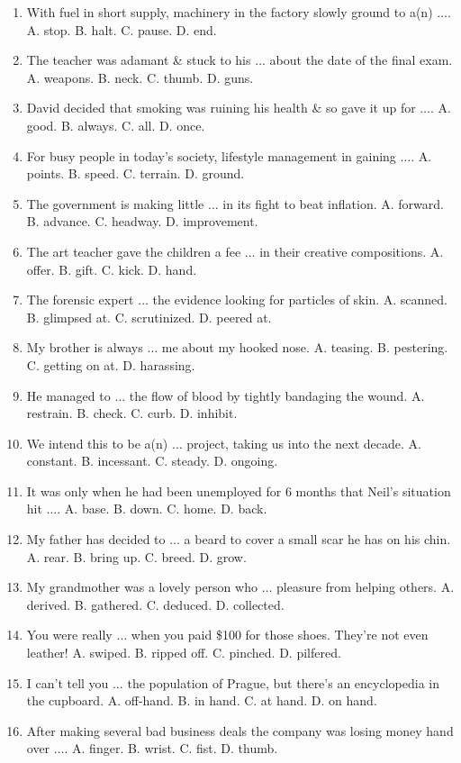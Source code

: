 \documentclass{article}
\numberwithin{equation}{section}
\begin{document}
\begin{enumerate}[leftmargin=2mm]
	\item With fuel in short supply, machinery in the factory slowly ground to a(n) $\ldots$. A. stop. B. halt. C. pause. D. end.
	\item The teacher was adamant \& stuck to his $\ldots$ about the date of the final exam. A. weapons. B. neck. C. thumb. D. guns.
	\item David decided that smoking was ruining his health \& so gave it up for $\ldots$. A. good. B. always. C. all. D. once.
	\item For busy people in today's society, lifestyle management in gaining $\ldots$. A. points. B. speed. C. terrain. D. ground.
	\item The government is making little $\ldots$ in its fight to beat inflation. A. forward. B. advance. C. headway. D. improvement.
	\item The art teacher gave the children a fee $\ldots$ in their creative compositions. A. offer. B. gift. C. kick. D. hand.
	\item The forensic expert $\ldots$ the evidence looking for particles of skin. A. scanned. B. glimpsed at. C. scrutinized. D. peered at.
	\item My brother is always $\ldots$ me about my hooked nose. A. teasing. B. pestering. C. getting on at. D. harassing.
	\item He managed to $\ldots$ the flow of blood by tightly bandaging the wound. A. restrain. B. check. C. curb. D. inhibit.
	\item We intend this to be a(n) $\ldots$ project, taking us into the next decade. A. constant. B. incessant. C. steady. D. ongoing.
	\item It was only when he had been unemployed for 6 months that Neil's situation hit $\ldots$. A. base. B. down. C. home. D. back.
	\item My father has decided to $\ldots$ a beard to cover a small scar he has on his chin. A. rear. B. bring up. C. breed. D. grow.
	\item My grandmother was a lovely person who $\ldots$ pleasure from helping others. A. derived. B. gathered. C. deduced. D. collected.
	\item You were really $\ldots$ when you paid \$100 for those shoes. They're not even leather! A. swiped. B. ripped off. C. pinched. D. pilfered.
	\item I can't tell you $\ldots$ the population of Prague, but there's an encyclopedia in the cupboard. A. off-hand. B. in hand. C. at hand. D. on hand.
	\item After making several bad business deals the company was losing money hand over $\ldots$. A. finger. B. wrist. C. fist. D. thumb.

\end{enumerate}
\end{document}
